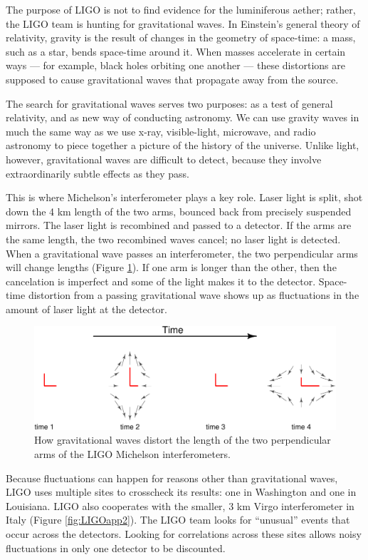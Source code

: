 \documentclass[english,floatsintext,man]{apa6}
\theoremstyle{definition}
\theoremstyle{definition}
\theoremstyle{definition}
\theoremstyle{remark}
\begin{document}
The purpose of LIGO is not to find evidence for the luminiferous aether;
rather, the LIGO team is hunting for gravitational waves. In Einstein's
general theory of relativity, gravity is the result of changes in the
geometry of space-time: a mass, such as a star, bends space-time around
it. When masses accelerate in certain ways --- for example, black holes
orbiting one another --- these distortions are supposed to cause
gravitational waves that propagate away from the source.

The search for gravitational waves serves two purposes: as a test of
general relativity, and as new way of conducting astronomy. We can use
gravity waves in much the same way as we use x-ray, visible-light,
microwave, and radio astronomy to piece together a picture of the
history of the universe. Unlike light, however, gravitational waves are
difficult to detect, because they involve extraordinarily subtle effects
as they pass.

This is where Michelson's interferometer plays a key role. Laser light
is split, shot down the 4 km length of the two arms, bounced back from
precisely suspended mirrors. The laser light is recombined and passed to
a detector. If the arms are the same length, the two recombined waves
cancel; no laser light is detected. When a gravitational wave passes an
interferometer, the two perpendicular arms will change lengths (Figure
\ref{fig:LIGOapp1}). If one arm is longer than the other, then the
cancelation is imperfect and some of the light makes it to the detector.
Space-time distortion from a passing gravitational wave shows up as
fluctuations in the amount of laser light at the detector.

\begin{figure}
\centering
\includegraphics{paper_pdf_files/figure-latex/LIGOapp1-1.pdf}
\caption{\label{fig:LIGOapp1}How gravitational waves distort the length of
the two perpendicular arms of the LIGO Michelson interferometers.}
\end{figure}

Because fluctuations can happen for reasons other than gravitational
waves, LIGO uses multiple sites to crosscheck its results: one in
Washington and one in Louisiana. LIGO also cooperates with the smaller,
3 km Virgo interferometer in Italy (Figure \ref{fig:LIGOapp2}). The LIGO
team looks for \enquote{unusual} events that occur across the detectors.
Looking for correlations across these sites allows noisy fluctuations in
only one detector to be discounted.
\end{document}
